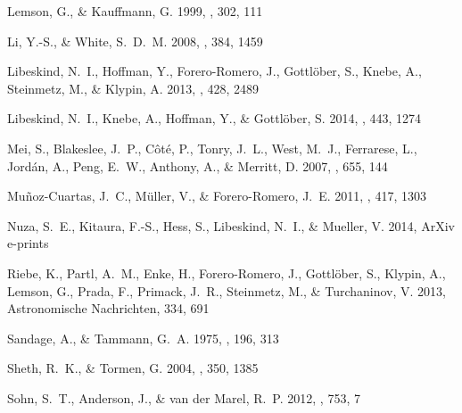 \documentclass{emulateapj}
\begin{document}
\begin{thebibliography}{38}
{Lemson}, G., \& {Kauffmann}, G. 1999, \mnras, 302, 111

{Li}, Y.-S., \& {White}, S.~D.~M. 2008, \mnras, 384, 1459

{Libeskind}, N.~I., {Hoffman}, Y., {Forero-Romero}, J., {Gottl{\"o}ber}, S.,
  {Knebe}, A., {Steinmetz}, M., \& {Klypin}, A. 2013, \mnras, 428, 2489

{Libeskind}, N.~I., {Knebe}, A., {Hoffman}, Y., \& {Gottl{\"o}ber}, S. 2014,
  \mnras, 443, 1274

{Mei}, S., {Blakeslee}, J.~P., {C{\^o}t{\'e}}, P., {Tonry}, J.~L., {West},
  M.~J., {Ferrarese}, L., {Jord{\'a}n}, A., {Peng}, E.~W., {Anthony}, A., \&
  {Merritt}, D. 2007, \apj, 655, 144

{Mu{\~n}oz-Cuartas}, J.~C., {M{\"u}ller}, V., \& {Forero-Romero}, J.~E. 2011,
  \mnras, 417, 1303

{Nuza}, S.~E., {Kitaura}, F.-S., {Hess}, S., {Libeskind}, N.~I., \& {Mueller},
  V. 2014, ArXiv e-prints

{Riebe}, K., {Partl}, A.~M., {Enke}, H., {Forero-Romero}, J., {Gottl{\"o}ber},
  S., {Klypin}, A., {Lemson}, G., {Prada}, F., {Primack}, J.~R., {Steinmetz},
  M., \& {Turchaninov}, V. 2013, Astronomische Nachrichten, 334, 691

{Sandage}, A., \& {Tammann}, G.~A. 1975, \apj, 196, 313

{Sheth}, R.~K., \& {Tormen}, G. 2004, \mnras, 350, 1385

{Sohn}, S.~T., {Anderson}, J., \& {van der Marel}, R.~P. 2012, \apj, 753, 7


\end{thebibliography}
\end{document}
